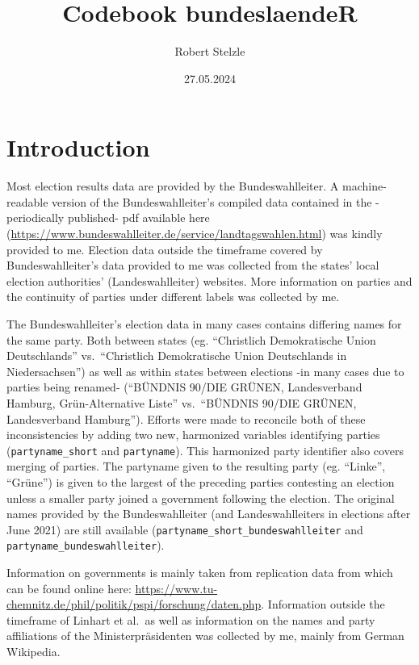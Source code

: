 \documentclass[
]{scrartcl}
\title{Codebook bundeslaendeR}
\author{Robert Stelzle}
\date{27.05.2024}
\begin{document}
\maketitle

{
\setcounter{tocdepth}{1}
\tableofcontents
}
\clearpage

\hypertarget{introduction}{%
\section{Introduction}\label{introduction}}

Most election results data are provided by the Bundeswahlleiter. A
machine-readable version of the Bundeswahlleiter's compiled data
contained in the -periodically published- pdf available here
(\url{https://www.bundeswahlleiter.de/service/landtagswahlen.html}) was
kindly provided to me. Election data outside the timeframe covered by
Bundeswahlleiter's data provided to me was collected from the states'
local election authorities' (Landeswahlleiter) websites. More
information on parties and the continuity of parties under different
labels was collected by me.

The Bundeswahlleiter's election data in many cases contains differing
names for the same party. Both between states (eg. ``Christlich
Demokratische Union Deutschlands'' vs.~``Christlich Demokratische Union
Deutschlands in Niedersachsen'') as well as within states between
elections -in many cases due to parties being renamed- (``BÜNDNIS 90/DIE
GRÜNEN, Landesverband Hamburg, Grün-Alternative Liste'' vs.~``BÜNDNIS
90/DIE GRÜNEN, Landesverband Hamburg''). Efforts were made to reconcile
both of these inconsistencies by adding two new, harmonized variables
identifying parties (\texttt{partyname\_short} and \texttt{partyname}).
This harmonized party identifier also covers merging of parties. The
partyname given to the resulting party (eg. ``Linke'', ``Grüne'') is
given to the largest of the preceding parties contesting an election
unless a smaller party joined a government following the election. The
original names provided by the Bundeswahlleiter (and Landeswahlleiters
in elections after June 2021) are still available
(\texttt{partyname\_short\_bundeswahlleiter} and
\texttt{partyname\_bundeswahlleiter}).

Information on governments is mainly taken from replication data from
\textcite{linhartProportionaleMinisterienaufteilungDeutschen2008} which
can be found online here:
\url{https://www.tu-chemnitz.de/phil/politik/pspi/forschung/daten.php}.
Information outside the timeframe of Linhart et al.~as well as
information on the names and party affiliations of the
Ministerpräsidenten was collected by me, mainly from German Wikipedia.
\end{document}
